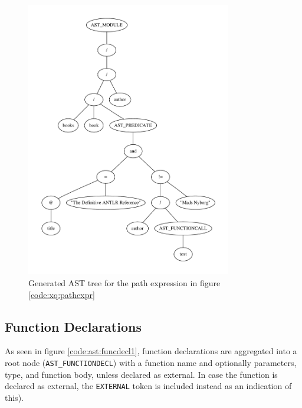 \begin{figure}[h!]

\caption{Path expression example, generates AST seen in figure \ref{tree:ast:pathexpr}}
\label{code:xq:pathexpr}
\centering
 \includegraphics[width=0.8\textwidth]{img/graphs/pathexpr}
\caption{Generated AST tree for the path expression in figure 
\ref{code:xq:pathexpr}}
\label{tree:ast:pathexpr}
\end{figure}

\pagebreak
\subsection{Function Declarations}
As seen in figure \ref{code:ast:funcdecl1}, function declarations are aggregated
into a root node (\verb!AST_FUNCTIONDECL!) with a function name and optionally
parameters, type, and function body, unless declared as external. In case the
function is declared as external, the \verb!EXTERNAL! token is included instead
as an indication of this).

